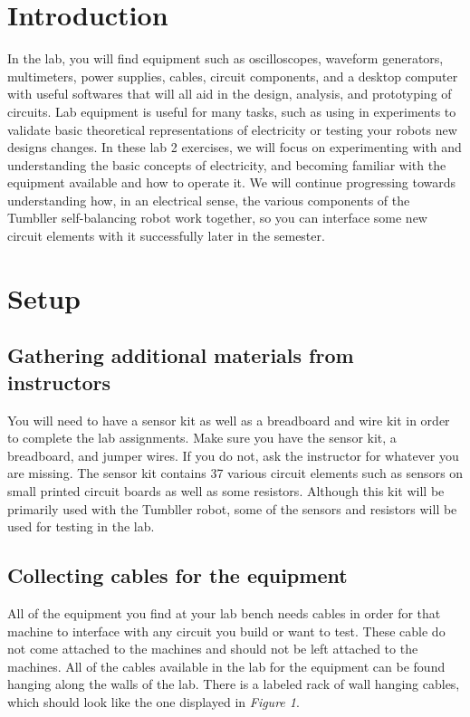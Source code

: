 \documentclass[12pt]{article}
\begin{document}
\MakeLabTop

\section{Introduction}

In the lab, you will find equipment such as oscilloscopes, waveform generators, multimeters, power supplies, cables, circuit components, and a desktop computer with useful softwares that will all aid in the design, analysis, and prototyping of circuits. Lab equipment is useful for many tasks, such as using in experiments to validate basic theoretical representations of electricity or testing your robots new designs changes. In these lab 2 exercises, we will focus on experimenting with and understanding the basic concepts of electricity, and becoming familiar with the equipment available and how to operate it. We will continue progressing towards understanding how, in an electrical sense, the various components of the Tumbller self-balancing robot work together, so you can interface some new circuit elements with it successfully later in the semester. 

\section{Setup}

\subsection{Gathering additional materials from instructors}

You will need to have a sensor kit as well as a breadboard and wire kit in order to complete the lab assignments. Make sure you have the sensor kit, a breadboard, and jumper wires. If you do not, ask the instructor for whatever you are missing. The sensor kit contains 37 various circuit elements such as sensors on small printed circuit boards as well as some resistors. Although this kit will be primarily used with the Tumbller robot, some of the sensors and resistors will be used for testing in the lab.


\subsection{Collecting cables for the equipment}

All of the equipment you find at your lab bench needs cables in order for that machine to interface with any circuit you build or want to test. These cable do not come attached to the machines and should not be left attached to the machines. All of the cables available in the lab for the equipment can be found hanging along the walls of the lab. There is a labeled rack of wall hanging cables, which should look like the one displayed in \textit{Figure 1}.
\end{document}
